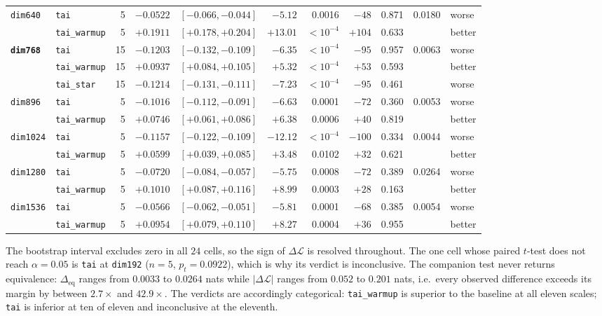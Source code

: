 \documentclass[final,5p,times,twocolumn]{elsarticle}
\theoremstyle{remark}
\newcommand{\dL}{\Delta\mathcal{L}}
\begin{document}
\begin{table}[t]
\begin{tabular}{@{}llrrrrrrrrl@{}}
\texttt{dim640} & \texttt{tai} & 5 & $-0.0522$ & $[-0.066,-0.044]$ & $-5.12$ & 0.0016 & $-48$ & 0.871 & 0.0180 & worse \\
& \texttt{tai\_warmup} & 5 & $+0.1911$ & $[+0.178,+0.204]$ & $+13.01$ & $<10^{-4}$ & $+104$ & 0.633 &  & better \\
\textbf{\texttt{dim768}} & \texttt{tai} & 15 & $-0.1203$ & $[-0.132,-0.109]$ & $-6.35$ & $<10^{-4}$ & $-95$ & 0.957 & 0.0063 & worse \\
& \texttt{tai\_warmup} & 15 & $+0.0937$ & $[+0.084,+0.105]$ & $+5.32$ & $<10^{-4}$ & $+53$ & 0.593 &  & better \\
& \texttt{tai\_star} & 15 & $-0.1214$ & $[-0.131,-0.111]$ & $-7.23$ & $<10^{-4}$ & $-95$ & 0.461 &  & worse \\
\texttt{dim896} & \texttt{tai} & 5 & $-0.1016$ & $[-0.112,-0.091]$ & $-6.63$ & 0.0001 & $-72$ & 0.360 & 0.0053 & worse \\
& \texttt{tai\_warmup} & 5 & $+0.0746$ & $[+0.061,+0.086]$ & $+6.38$ & 0.0006 & $+40$ & 0.819 &  & better \\
\texttt{dim1024} & \texttt{tai} & 5 & $-0.1157$ & $[-0.122,-0.109]$ & $-12.12$ & $<10^{-4}$ & $-100$ & 0.334 & 0.0044 & worse \\
& \texttt{tai\_warmup} & 5 & $+0.0599$ & $[+0.039,+0.085]$ & $+3.48$ & 0.0102 & $+32$ & 0.621 &  & better \\
\texttt{dim1280} & \texttt{tai} & 5 & $-0.0720$ & $[-0.084,-0.057]$ & $-5.75$ & 0.0008 & $-72$ & 0.389 & 0.0264 & worse \\
& \texttt{tai\_warmup} & 5 & $+0.1010$ & $[+0.087,+0.116]$ & $+8.99$ & 0.0003 & $+28$ & 0.163 &  & better \\
\texttt{dim1536} & \texttt{tai} & 5 & $-0.0566$ & $[-0.062,-0.051]$ & $-5.81$ & 0.0001 & $-68$ & 0.385 & 0.0054 & worse \\
& \texttt{tai\_warmup} & 5 & $+0.0954$ & $[+0.079,+0.110]$ & $+8.27$ & 0.0004 & $+36$ & 0.955 &  & better \\
\bottomrule
\end{tabular}
\end{table}

The bootstrap interval excludes zero in all $24$ cells, so the sign of $\dL$
is resolved throughout. The one cell whose paired $t$-test does not reach
$\alpha = 0.05$ is \texttt{tai} at \texttt{dim192} ($n=5$, $p_t = 0.0922$),
which is why its verdict is inconclusive. The companion test never returns equivalence: $\Delta_{\mathrm{eq}}$
ranges from $0.0033$ to $0.0264$ nats while $|\dL|$ ranges from $0.052$ to
$0.201$ nats, i.e.\ every observed difference exceeds its margin by between
$2.7\times$ and $42.9\times$. The verdicts are accordingly categorical:
\texttt{tai\_warmup} is superior to the baseline at all eleven scales;
\texttt{tai} is inferior at ten of eleven and inconclusive at the eleventh.
\end{document}
